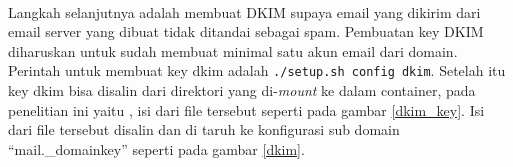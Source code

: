 \documentclass[./bab_4.tex]{subfiles}
\begin{document}
\begin{enumerate}[label=\textbf{\arabic*.}]
      \paragraph*{} Langkah selanjutnya adalah membuat DKIM
      supaya email yang dikirim dari email server yang
      dibuat tidak ditandai sebagai spam.
      Pembuatan key DKIM diharuskan
      untuk sudah membuat minimal satu akun email dari
      domain. Perintah untuk membuat key dkim adalah
      \texttt{./setup.sh config dkim}. Setelah itu 
      key dkim bisa disalin dari direktori yang di-\textit{mount}
      ke dalam container, pada penelitian ini yaitu
      \texttt{},
      isi dari file tersebut seperti pada gambar
      \ref{dkim_key}.
      Isi dari file tersebut disalin dan di taruh ke
      konfigurasi sub domain ``mail.\_domainkey'' seperti pada
      gambar \ref{dkim}. 

  \end{enumerate}
\end{document}
